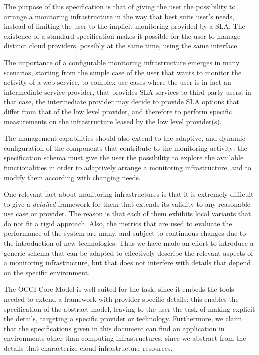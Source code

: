 \documentclass[12pt]{article}  %
\begin{document}
The purpose of this specification is that of giving the user the possibility to arrange a monitoring infrastructure in the way that best suits user's needs, instead of limiting the user to the implicit monitoring provided by a SLA. The existence of a standard specification makes it possible for the user to manage distinct cloud providers, possibly at the same time, using the same interface.

The importance of a configurable monitoring infrastructure emerges in many scenarios, starting from the simple case of the user that wants to monitor the activity of a web service, to complex use cases where the user is in fact an intermediate service provider, that provides SLA services to third party users: in that case, the intermediate provider may decide to provide SLA options that differ from that of the low level provider, and therefore to perform specific measurements on the infrastructure leased by the low level provider(s).

The management capabilities should also extend to the adaptive, and dynamic configuration of the components that contribute to the monitoring activity: the specification schema must give the user the possibility to explore the available functionalities in order to adaptively arrange a monitoring infrastructure, and to modify them according with changing needs.

One relevant fact about monitoring infrastructures is that it is extremely difficult to give a {\em detailed} framework for them that extends its validity to any reasonable use case or provider. The reason is that each of them exhibits local variants that do not fit a rigid approach. Also, the metrics that are used to evaluate the performance of the system are many, and subject to continuous changes due to the introduction of new technologies. Thus we have made an effort to introduce a generic schema that can be adapted to effectively describe the relevant aspects of a monitoring infrastructure, but that does not interfere with details that depend on the specific environment.

The OCCI Core Model \cite{occi:core} is well suited for the task, since it embeds the tools needed to extend a framework with provider specific details: this enables the specification of the abstract model, leaving to the user the task of making explicit the details, targeting a specific provider or technology. Furthermore, we claim that the specifications given in this document can find an application in environments other than computing infrastructures, since we abstract from the details that characterize cloud infrastructure resources.
\end{document}
